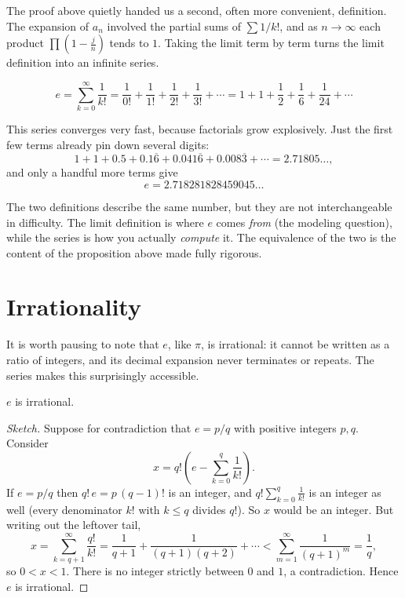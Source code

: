 \documentclass{essay}
\begin{document}
The proof above quietly handed us a second, often more convenient, definition. The expansion of $a_n$ involved the partial sums of $\sum 1/k!$, and as $n \to \infty$ each product $\prod\left(1 - \tfrac{j}{n}\right)$ tends to $1$. Taking the limit term by term turns the limit definition into an infinite series.

\begin{definition}
\[
e = \sum_{k=0}^{\infty} \frac{1}{k!}
  = \frac{1}{0!} + \frac{1}{1!} + \frac{1}{2!} + \frac{1}{3!} + \cdots
  = 1 + 1 + \frac{1}{2} + \frac{1}{6} + \frac{1}{24} + \cdots
\]
\end{definition}

This series converges very fast, because factorials grow explosively. Just the first few terms already pin down several digits:
\[
1 + 1 + 0.5 + 0.1\overline{6} + 0.041\overline{6} + 0.008\overline{3} + \cdots = 2.71805\ldots,
\]
and only a handful more terms give
\[
e = 2.718281828459045\ldots
\]

The two definitions describe the same number, but they are not interchangeable in difficulty. The limit definition is where $e$ comes \emph{from} (the modeling question), while the series is how you actually \emph{compute} it. The equivalence of the two is the content of the proposition above made fully rigorous.

\section{Irrationality}

It is worth pausing to note that $e$, like $\pi$, is irrational: it cannot be written as a ratio of integers, and its decimal expansion never terminates or repeats. The series makes this surprisingly accessible.

\begin{theorem}
$e$ is irrational.
\end{theorem}

\begin{proof}[Sketch]
Suppose for contradiction that $e = p/q$ with positive integers $p, q$. Consider
\[
x = q!\left(e - \sum_{k=0}^{q}\frac{1}{k!}\right).
\]
If $e = p/q$ then $q!\,e = p\,(q-1)!$ is an integer, and $q!\sum_{k=0}^{q}\tfrac{1}{k!}$ is an integer as well (every denominator $k!$ with $k \le q$ divides $q!$). So $x$ would be an integer. But writing out the leftover tail,
\[
x = \sum_{k=q+1}^{\infty}\frac{q!}{k!}
  = \frac{1}{q+1} + \frac{1}{(q+1)(q+2)} + \cdots
  < \sum_{m=1}^{\infty}\frac{1}{(q+1)^m}
  = \frac{1}{q},
\]
so $0 < x < 1$. There is no integer strictly between $0$ and $1$, a contradiction. Hence $e$ is irrational.
\end{proof}
\end{document}
